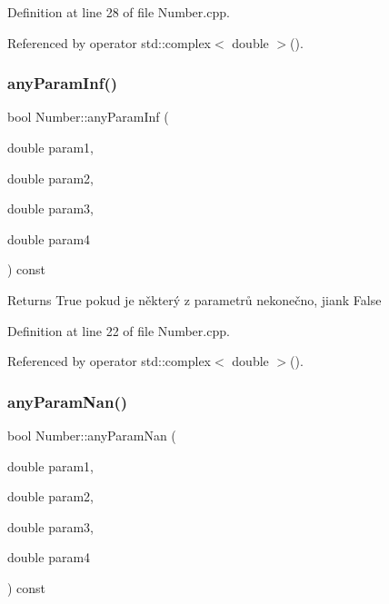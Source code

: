 Definition at line 28 of file Number.\+cpp.



Referenced by operator std\+::complex$<$ double $>$().

\mbox{\label{classteam22_1_1_math_1_1_number_a98630956cc596c65f97ad0f24b500168}} 
\subsubsection{\texorpdfstring{any\+Param\+Inf()}{anyParamInf()}}
{\footnotesize\ttfamily bool Number\+::any\+Param\+Inf (\begin{DoxyParamCaption}\item[{double}]{param1,  }\item[{double}]{param2,  }\item[{double}]{param3,  }\item[{double}]{param4 }\end{DoxyParamCaption}) const\hspace{0.3cm}{\ttfamily [private]}}

\begin{DoxyReturn}{Returns}
True pokud je některý z parametrů nekonečno, jiank False 
\end{DoxyReturn}


Definition at line 22 of file Number.\+cpp.



Referenced by operator std\+::complex$<$ double $>$().

\mbox{\label{classteam22_1_1_math_1_1_number_a689b79b83d633155ac15465523634d63}} 
\subsubsection{\texorpdfstring{any\+Param\+Nan()}{anyParamNan()}}
{\footnotesize\ttfamily bool Number\+::any\+Param\+Nan (\begin{DoxyParamCaption}\item[{double}]{param1,  }\item[{double}]{param2,  }\item[{double}]{param3,  }\item[{double}]{param4 }\end{DoxyParamCaption}) const\hspace{0.3cm}{\ttfamily [private]}}

